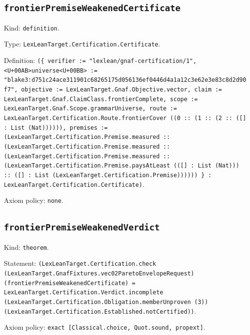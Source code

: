 \documentclass[11pt]{article}
\begin{document}
\subsection*{\texttt{frontierPremiseWeakenedCertificate}}
\noindent Kind: \texttt{definition}.\par
\noindent Type: \texttt{LexLeanTarget.Certification.Certificate}.\par
\noindent Definition: \texttt{(\{ verifier := "lexlean/gnaf-certification/1", <U+00AB>universe<U+00BB> := "blake3:d751c24ace311901c68265175d056136ef0446d4a1a12c3e62e3e83c8d2d90f7", objective := LexLeanTarget.Gnaf.Objective.vector, claim := LexLeanTarget.Gnaf.ClaimClass.frontierComplete, scope := LexLeanTarget.Gnaf.Scope.grammarUniverse, route := LexLeanTarget.Certification.Route.frontierCover ((0 :: (1 :: (2 :: ([] : List (Nat)))))), premises := (LexLeanTarget.Certification.Premise.measured :: (LexLeanTarget.Certification.Premise.measured :: (LexLeanTarget.Certification.Premise.measured :: (LexLeanTarget.Certification.Premise.paysAtLeast (([] : List (Nat))) :: ([] : List (LexLeanTarget.Certification.Premise)))))) \} : LexLeanTarget.Certification.Certificate)}.\par
\noindent Axiom policy: \texttt{none}.\par
\subsection*{\texttt{frontierPremiseWeakenedVerdict}}
\noindent Kind: \texttt{theorem}.\par
\noindent Statement: \texttt{(LexLeanTarget.Certification.check (LexLeanTarget.GnafFixtures.vec02ParetoEnvelopeRequest) (frontierPremiseWeakenedCertificate) = LexLeanTarget.Certification.Verdict.incomplete (LexLeanTarget.Certification.Obligation.memberUnproven (3)) (LexLeanTarget.Certification.Established.notCertified))}.\par
\noindent Axiom policy: \texttt{exact [Classical.choice, Quot.sound, propext]}.\par
\end{document}
